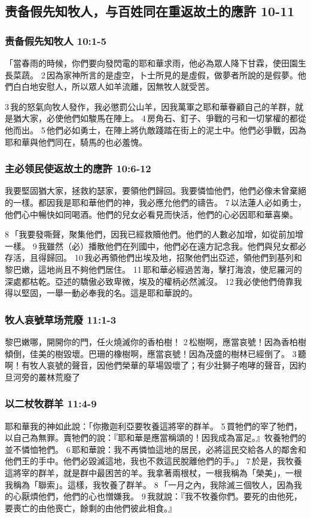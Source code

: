 \subsection{责备假先知牧人，与百姓同在重返故土的應許 10-11}
\subsubsection{责备假先知牧人 10:1-5}
「當春雨的時候，你們要向發閃電的耶和華求雨，他必為眾人降下甘霖，使田園生長菜蔬。 2 因為家神所言的是虛空，卜士所見的是虛假，做夢者所說的是假夢。他們白白地安慰人，所以眾人如羊流離，因無牧人就受苦。 

3 我的怒氣向牧人發作，我必懲罰公山羊，因我萬軍之耶和華眷顧自己的羊群，就是猶大家，必使他們如駿馬在陣上。 4 房角石、釘子、爭戰的弓和一切掌權的都從他而出。 5 他們必如勇士，在陣上將仇敵踐踏在街上的泥土中。他們必爭戰，因為耶和華與他們同在，騎馬的也必羞愧。


\subsubsection{主必领民使返故土的應許 10:6-12}

我要堅固猶大家，拯救約瑟家，要領他們歸回。我要憐恤他們，他們必像未曾棄絕的一樣。都因我是耶和華他們的神，我必應允他們的禱告。 7 以法蓮人必如勇士，他們心中暢快如同喝酒。他們的兒女必看見而快活，他們的心必因耶和華喜樂。

8 「我要發嘶聲，聚集他們，因我已經救贖他們。他們的人數必加增，如從前加增一樣。 9 我雖然（必）播散他們在列國中，他們必在遠方記念我。他們與兒女都必存活，且得歸回。 10 我必再領他們出埃及地，招聚他們出亞述，領他們到基列和黎巴嫩，這地尚且不夠他們居住。 11 耶和華必經過苦海，擊打海浪，使尼羅河的深處都枯乾。亞述的驕傲必致卑微，埃及的權柄必然滅沒。 12 我必使他們倚靠我得以堅固，一舉一動必奉我的名。這是耶和華說的。


\subsubsection{牧人哀號草场荒廢 11:1-3}
黎巴嫩哪，開開你的門，任火燒滅你的香柏樹！ 2 松樹啊，應當哀號！因為香柏樹傾倒，佳美的樹毀壞。巴珊的橡樹啊，應當哀號！因為茂盛的樹林已經倒了。 3 聽啊！有牧人哀號的聲音，因他們榮華的草場毀壞了；有少壯獅子咆哮的聲音，因約旦河旁的叢林荒廢了


\subsubsection{以二杖牧群羊 11:4-9}
耶和華我的神如此說：「你撒迦利亞要牧養這將宰的群羊。 5 買牠們的宰了牠們，以自己為無罪。賣牠們的說：『耶和華是應當稱頌的！因我成為富足。』牧養牠們的並不憐恤牠們。 6 耶和華說：我不再憐恤這地的居民，必將這民交給各人的鄰舍和他們王的手中。他們必毀滅這地，我也不救這民脫離他們的手。」 7 於是，我牧養這將宰的群羊，就是群中最困苦的羊。我拿著兩根杖，一根我稱為「榮美」，一根我稱為「聯索」。這樣，我牧養了群羊。 8 「一月之內，我除滅三個牧人，因為我的心厭煩他們，他們的心也憎嫌我。 9 我就說：『我不牧養你們。要死的由他死，要喪亡的由他喪亡，餘剩的由他們彼此相食。』

